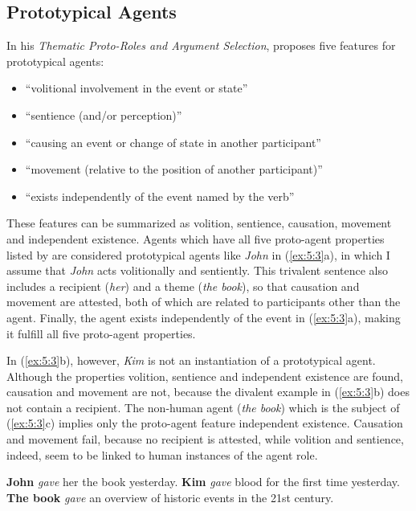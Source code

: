 \documentclass[output=paper]{LSP/langsci}
\begin{document}
\subsection{Prototypical Agents}
In his \textit{Thematic Proto-Roles and Argument Selection}, \citet[572]{Dowty1991} proposes five features for prototypical agents:

\begin{itemize}
\item “volitional involvement in the event or state”
\item “sentience (and/or perception)”
\item “causing an event or change of state in another participant”
\item “movement (relative to the position of another participant)”
\item “exists independently of the event named by the verb”
\end{itemize}

These features can be summarized as volition, sentience, causation, movement and independent existence. Agents which have all five proto-agent properties listed by \citet{Dowty1991} are considered prototypical agents like \textit{John} in (\ref{ex:5:3}a), in which I assume that \textit{John} acts volitionally and sentiently. This trivalent sentence also includes a recipient (\textit{her}) and a theme (\textit{the book}), so that causation and movement are attested, both of which are related to participants other than the agent. Finally, the agent exists independently of the event in (\ref{ex:5:3}a), making it fulfill all five proto-agent properties.

In (\ref{ex:5:3}b), however, \textit{Kim} is not an instantiation of a prototypical agent. Although the properties volition, sentience and independent existence are found, causation and movement are not, because the divalent example in (\ref{ex:5:3}b) does not contain a recipient. The non-human agent (\textit{the book}) which is the subject of (\ref{ex:5:3}c) implies only the proto-agent feature independent existence. Causation and movement fail, because no recipient is attested, while volition and sentience, indeed, seem to be linked to human instances of the agent role.\newline 

\ea \label{ex:5:3}
\ea \textbf{John} \textit{gave} her the book yesterday.
\ex \textbf{Kim} \textit{gave} blood for the first time yesterday.
\ex \textbf{The book} \textit{gave} an overview of historic events in the 21st century.
\z
\z
\end{document}
